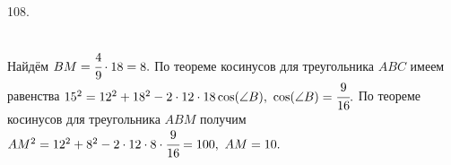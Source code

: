 108. \begin{figure}[ht!]
\end{figure}\\
Найдём $BM=\cfrac{4}{9}\cdot18=8.$ По теореме косинусов для треугольника $ABC$ имеем равенства $15^2=12^2+18^2-2\cdot12\cdot18\cos(\angle B),\ \cos(\angle B)=\cfrac{9}{16}.$ По теореме косинусов для треугольника $ABM$ получим $AM^2=12^2+8^2-2\cdot12\cdot8\cdot\cfrac{9}{16}=100,\ AM=10.$\\
